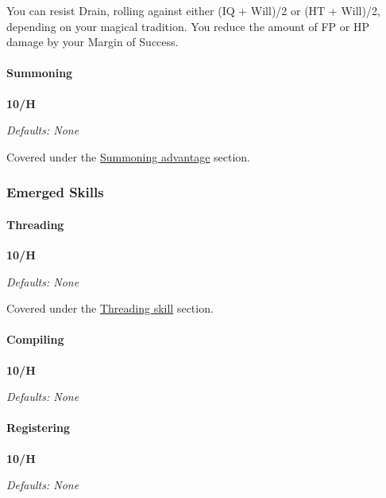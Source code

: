 \begin{multicols*}{3}
	You can resist Drain, rolling against either (IQ + Will)/2 or (HT + Will)/2, depending on your magical tradition. You reduce the amount of FP or HP damage by your Margin of Success.
	
	\paragraph{Summoning}
	\begin{flushright}
		\textbf{10/H}
	\end{flushright}
	\textcolor{NavyBlue}{\textit{Defaults: None}}
	
	Covered under the \hyperref[summoning]{Summoning advantage} section.
	
	
	\subsubsection*{Emerged Skills}
	
	\paragraph{Threading}
	\begin{flushright}
		\textbf{10/H}
	\end{flushright}
	\textcolor{NavyBlue}{\textit{Defaults: None}}
	
	Covered under the \hyperref[threading]{Threading skill} section.
	
	\paragraph{Compiling}
	\begin{flushright}
		\textbf{10/H}
	\end{flushright}
	\textcolor{NavyBlue}{\textit{Defaults: None}}
	
	\paragraph{Registering}
	\begin{flushright}
		\textbf{10/H}
	\end{flushright}
	\textcolor{NavyBlue}{\textit{Defaults: None}}
	
\end{multicols*}


